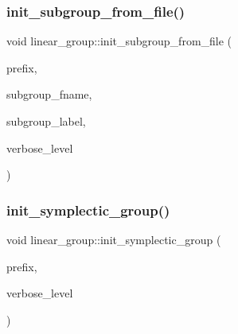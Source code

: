 \mbox{\label{classlinear__group_a55fd1f4c503f5b37dd818256efe259c6}} 
\subsubsection{\texorpdfstring{init\+\_\+subgroup\+\_\+from\+\_\+file()}{init\_subgroup\_from\_file()}}
{\footnotesize\ttfamily void linear\+\_\+group\+::init\+\_\+subgroup\+\_\+from\+\_\+file (\begin{DoxyParamCaption}\item[{\mbox{\hyperlink{galois_8h_ab6cc7b4aeb6ea31aba2b3fbfc83ff5e6}{B\+Y\+TE}} $\ast$}]{prefix,  }\item[{const \mbox{\hyperlink{galois_8h_ab6cc7b4aeb6ea31aba2b3fbfc83ff5e6}{B\+Y\+TE}} $\ast$}]{subgroup\+\_\+fname,  }\item[{const \mbox{\hyperlink{galois_8h_ab6cc7b4aeb6ea31aba2b3fbfc83ff5e6}{B\+Y\+TE}} $\ast$}]{subgroup\+\_\+label,  }\item[{\mbox{\hyperlink{galois_8h_a09fddde158a3a20bd2dcadb609de11dc}{I\+NT}}}]{verbose\+\_\+level }\end{DoxyParamCaption})}

\mbox{\label{classlinear__group_ab3dc99b8d6cb810eff6dc09fb69c47d4}} 
\subsubsection{\texorpdfstring{init\+\_\+symplectic\+\_\+group()}{init\_symplectic\_group()}}
{\footnotesize\ttfamily void linear\+\_\+group\+::init\+\_\+symplectic\+\_\+group (\begin{DoxyParamCaption}\item[{\mbox{\hyperlink{galois_8h_ab6cc7b4aeb6ea31aba2b3fbfc83ff5e6}{B\+Y\+TE}} $\ast$}]{prefix,  }\item[{\mbox{\hyperlink{galois_8h_a09fddde158a3a20bd2dcadb609de11dc}{I\+NT}}}]{verbose\+\_\+level }\end{DoxyParamCaption})}

